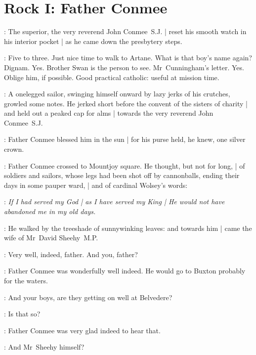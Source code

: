 \section*{Rock I: Father Conmee}

:
The superior, the very reverend John Conmee~S.J. |
reset his smooth watch in his interior pocket |
as he came down the presbytery steps.

\conmeeint:
Five to three.
Just nice time to walk to Artane.
What is that boy's name again?
Dignam.
Yes.
Brother Swan is the person to see.
Mr~Cunningham's letter.
Yes.
Oblige him, if possible.
Good practical catholic:
useful at mission time.


\begin{interject}
    :
    A onelegged sailor,
    swinging himself onward by lazy jerks of his crutches,
    growled some notes.
    He jerked short before the convent of the sisters of charity |
    and held out a peaked cap for alms |
    towards the very reverend John Conmee~S.J\@.
\end{interject}

:
Father Conmee blessed him in the sun |
for his purse held,
he knew,
one silver crown.


:
Father Conmee crossed to Mountjoy square.
He thought,
but not for long, |
of soldiers and sailors,
whose legs had been shot off by cannonballs,
ending their days in some pauper ward, |
and of cardinal Wolsey's words:

\conmeeint:
\emph{If I had served my God |
as I have served my King |
He would not have abandoned me in my old days.}

:
He walked by the treeshade of sunnywinking leaves:
and towards him |
came the wife of Mr~David Sheehy~M.P\@.


\mrssheehy:
Very well, indeed, father.
And you, father?

:
Father Conmee was wonderfully well indeed.
He would go to Buxton probably for the waters.%

\conmee:
And your boys, are they getting on well at Belvedere?

\conmee:
Is that so?

:
Father Conmee was very glad indeed to hear that.

\conmee:
And Mr~Sheehy himself?

